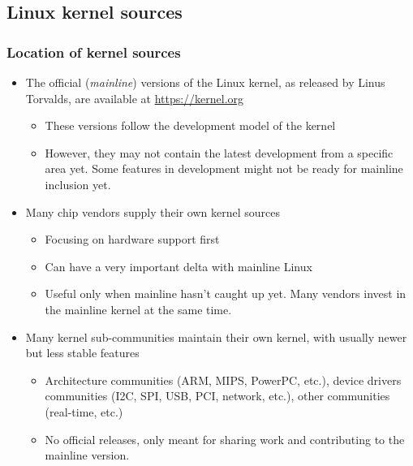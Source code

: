 \subsection{Linux kernel sources}

\begin{frame}
  \frametitle{Location of kernel sources}
  \begin{itemize}
  \item The official ({\em mainline}) versions of the Linux kernel, as released by Linus
    Torvalds, are available at \url{https://kernel.org}
    \begin{itemize}
    \item These versions follow the development model of the kernel
    \item However, they may not contain the latest development from a
      specific area yet. Some features in development might not be
      ready for mainline inclusion yet.
    \end{itemize}
  \item Many chip vendors supply their own kernel sources
    \begin{itemize}
    \item Focusing on hardware support first
    \item Can have a very important delta with mainline Linux
    \item Useful only when mainline hasn't caught up yet. Many vendors
          invest in the mainline kernel at the same time.
    \end{itemize}
  \item Many kernel sub-communities maintain their own kernel, with
    usually newer but less stable features
    \begin{itemize}
    \item Architecture communities (ARM, MIPS, PowerPC, etc.), device
      drivers communities (I2C, SPI, USB, PCI, network, etc.), other
      communities (real-time, etc.)
    \item No official releases, only meant for sharing work and
      contributing to the mainline version.
    \end{itemize}
  \end{itemize}
\end{frame}

